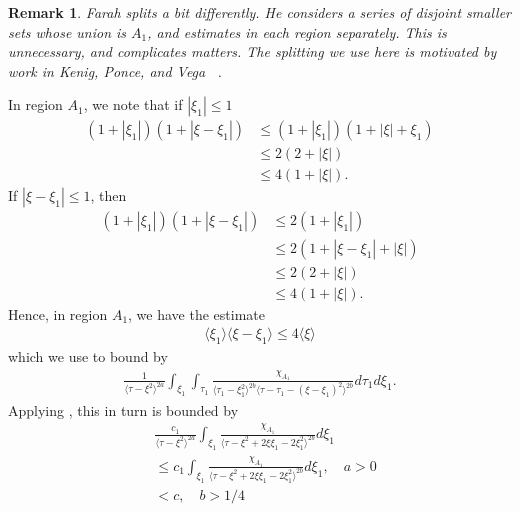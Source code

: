 \documentclass[12pt,reqno]{amsart}
\numberwithin{equation}{section}  %
\renewcommand{\cref}{\Cref}
\newtheorem{remark}[theorem]{Remark}
\begin{document}
%
%
\begin{framed}
\begin{remark}
Farah splits a bit differently. He considers a series of disjoint smaller sets
whose union is $A_{1}$, and estimates in each region separately.  This is
unnecessary, and complicates matters. The splitting we use here is motivated by
work in Kenig, Ponce, and Vega~\cite{Kenig:1996aa}
\label{rem:farah-dif-splitting-organization}.
\end{remark}
\end{framed}
%
In region $A_{1}$, we note that if $| \xi_{1} | \le 1$
%
%
%
%
\begin{equation*}
\begin{split}
  (1 + | \xi_{1} |)(1 + | \xi - \xi_{1} |)
  & \le (1 + | \xi_{1} |)(1 + | \xi | + \xi_{1})
  \\
  & \le 2 (2 + | \xi |)
  \\
  & \le 4 (1 + | \xi |).
\end{split}
\end{equation*}
%
%
If $| \xi - \xi_{1} |\le 1$, then
%
%
\begin{equation*}
\begin{split}
  (1 + | \xi_{1} |)(1 + | \xi - \xi_{1} |)
  & \le 2 (1 + | \xi_{1} |)
  \\
  & \le 2 (1 + | \xi - \xi_{1} | + | \xi |)
  \\
  & \le 2(2 + | \xi |)
  \\
  & \le 4 (1 + | \xi |).
\end{split}
\end{equation*}
%
%
Hence, in region $A_{1}$, we have the estimate
%
%
\begin{equation}
\begin{split}
  \langle \xi_{1} \rangle \langle \xi - \xi_{1} \rangle  \le 4 \langle \xi \rangle 
\end{split}
\label{splitting-estimate}
\end{equation}
%
%
which we use to bound \cref{case-1-region-1} by
%
%
%
%
\begin{equation*}
\begin{split}
    \frac{ 1}{\langle \tau - \xi^{2} \rangle ^{2a}}
    \int_{\xi_{1}} \int_{\tau_{1}} \frac{\chi_{A_{1}}}{  
    \langle \tau_{1} - \xi_{1}^{2} \rangle^{2b} \langle  \tau - \tau_{1} -
    (\xi - \xi_{1})^{2} \rangle^{2b} }
    d \tau_1 d \xi_{1}.
\end{split}
\end{equation*}
%
%
Applying \cref{lem:calc}, this in turn is bounded by
%
%
\begin{equation}
  \label{uniform-bound-region-1}
\begin{split}
  & \frac{c_{1}}{\langle \tau - \xi^{2} \rangle^{2a}} \int_{\xi_{1}}
  \frac{\chi_{A_{1}}}{\langle \tau - \xi^{2} + 2 \xi \xi_{1} - 2
  \xi_{1}^{2} \rangle^{2b} } d \xi_{1}
  \\
  & \le c_{1} \int_{\xi_{1}}
  \frac{\chi_{A_{1}}}{\langle \tau - \xi^{2} + 2 \xi \xi_{1} - 2
  \xi_{1}^{2} \rangle^{2b} } d \xi_{1}, \quad a > 0
  \\
& < c, \quad b > 1/4
\end{split}
\end{equation}
\end{document}
